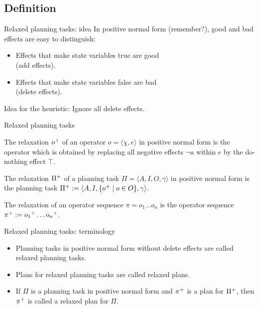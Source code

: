 \documentclass{gkibeamer}
\begin{document}
\subsection{Definition}

\begin{frame}{Relaxed planning tasks: idea}
  In \alert{positive normal form} (remember?), good and bad effects
  are easy to distinguish:
  \begin{itemize}
  \item Effects that make state variables true are good \\
    (\alert{add effects}).
  \item Effects that make state variables false are bad \\
    (\alert{delete effects}).
  \end{itemize}
  
  Idea for the heuristic: Ignore all delete effects.
\end{frame}

\begin{frame}{Relaxed planning tasks}
  \begin{definition}
    The \alert{relaxation} ${o}^+$ of an operator
    $o = \langle \chi, e\rangle$ in positive normal form is the operator
    which is obtained by replacing all negative effects $\neg a$
    within $e$ by the do-nothing effect $\top$.
  \end{definition}
  
  \begin{definition}
    The \alert{relaxation} ${\Pi}^+$ of a planning task
    $\Pi = \langle A, I, O, \gamma\rangle$ in positive normal form is the
    planning task ${\Pi}^+ := \langle A, I,
    \{{o}^+ \mid o \in O\}, \gamma\rangle$.
  \end{definition}
  
  \begin{definition}
    The \alert{relaxation} of an operator sequence $\pi = o_1 \dots
    o_n$ is the operator sequence ${\pi}^+ :=
    {o_1}^+ \dots {o_n}^+$.
  \end{definition}
\end{frame}

\begin{frame}{Relaxed planning tasks: terminology}
  \begin{itemize}
  \item Planning tasks in positive normal form without delete effects
    are called \alert{relaxed planning tasks}.
  \item Plans for relaxed planning tasks are called \alert{relaxed
    plans}.
  \item If $\Pi$ is a planning task in positive normal form and
    ${\pi}^+$ is a plan for ${\Pi}^+$, then
    ${\pi}^+$ is called a \alert{relaxed plan for $\Pi$}.
  \end{itemize}
\end{frame}
\end{document}
